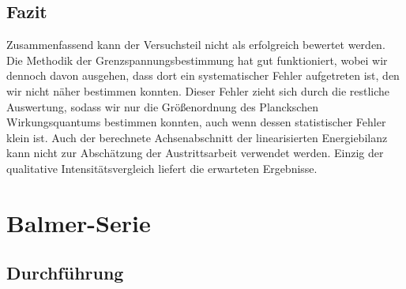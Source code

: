 \documentclass[11pt, a4paper]{article}
\numberwithin{equation}{section}
\begin{document}
\subsection{Fazit}
Zusammenfassend kann der Versuchsteil nicht als erfolgreich bewertet werden.
Die Methodik der Grenzspannungsbestimmung hat gut funktioniert, wobei wir dennoch davon ausgehen, dass dort ein systematischer Fehler aufgetreten ist, den wir nicht näher bestimmen konnten.
Dieser Fehler zieht sich durch die restliche Auswertung, sodass wir nur die Größenordnung des Planckschen Wirkungsquantums bestimmen konnten, auch wenn dessen statistischer Fehler klein ist.
Auch der berechnete Achsenabschnitt der linearisierten Energiebilanz kann nicht zur Abschätzung der Austrittsarbeit verwendet werden.
Einzig der qualitative Intensitätsvergleich liefert die erwarteten Ergebnisse.

\clearpage
\section{Balmer-Serie}

\subsection{Durchführung}
\end{document}
